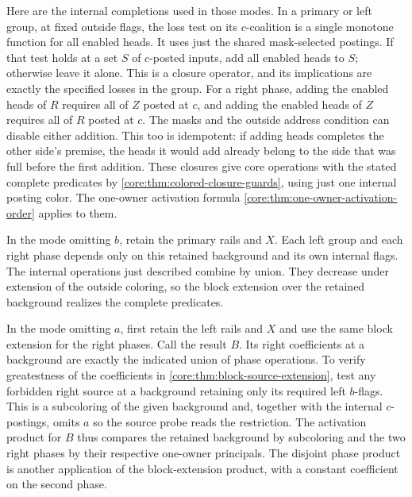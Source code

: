Here are the internal completions used in those modes.
In a primary or left group, at fixed outside flags, the
loss test on its $c$-coalition is a single monotone function
for all enabled heads. It uses just the shared mask-selected
postings. If that test holds at a set $S$ of $c$-posted
inputs, add all enabled heads to $S$; otherwise leave it
alone. This is a closure operator, and its implications
are exactly the specified losses in the group. For a right
phase, adding the enabled heads of $R$ requires all of $Z$
posted at $c$, and adding the enabled heads of $Z$ requires
all of $R$ posted at $c$. The masks and the outside address
condition can disable either addition. This too is
idempotent: if adding heads completes the other side's
premise, the heads it would add already belong to the side
that was full before the first addition. These closures
give core operations with the stated complete predicates
by \cref{core:thm:colored-closure-guards}, using just one
internal posting color. The one-owner activation formula
\cref{core:thm:one-owner-activation-order} applies to them.

In the mode omitting $b$, retain the primary rails and $X$.
Each left group and each right phase depends only on
this retained background and its own internal flags.
The internal operations just described combine by union.
They decrease under extension of the outside coloring,
so the block extension over the retained background
realizes the complete predicates.

In the mode omitting $a$, first retain the left rails and
$X$ and use the same block extension for the right phases.
Call the result $B$. Its right coefficients at a background
are exactly the indicated union of phase operations. To
verify greatestness of the coefficients in
\cref{core:thm:block-source-extension}, test any forbidden
right source at a background retaining only its required
left $b$-flags. This is a subcoloring of the given
background and, together with the internal $c$-postings,
omits $a$ so the source probe reads the restriction.
The activation product for $B$ thus compares the retained
background by subcoloring and the two right phases by
their respective one-owner principals. The disjoint phase
product is another application of the block-extension
product, with a constant coefficient on the second phase.

